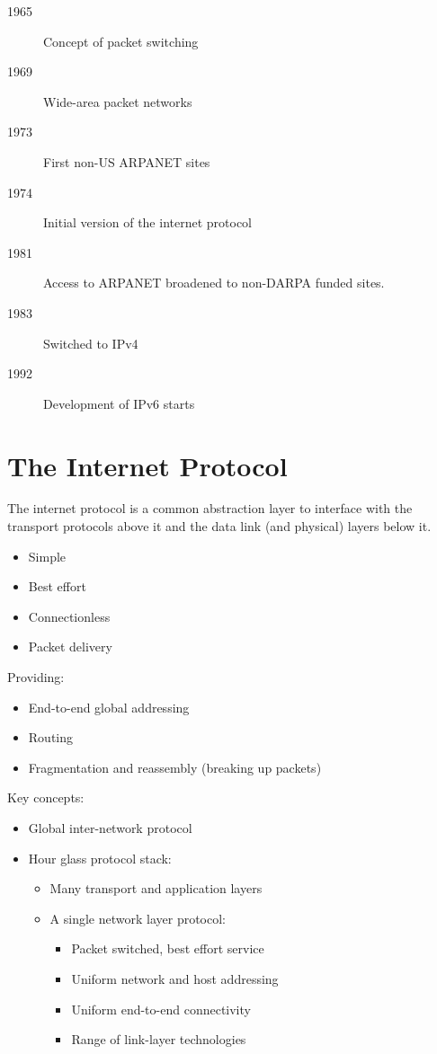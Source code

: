 \begin{description}
	\item[1965] Concept of packet switching
	\item[1969] Wide-area packet networks
	\item[1973] First non-US ARPANET sites
	\item[1974] Initial version of the internet protocol
	\item[1981] Access to ARPANET broadened to non-DARPA funded sites.
	\item[1983] Switched to IPv4
	\item[1992] Development of IPv6 starts
\end{description}

\section{The Internet Protocol}\label{sec:the_internet_protocol}

The internet protocol is a common abstraction layer to interface with the transport protocols above it and the data link (and physical) layers below it.
\begin{itemize}
	\item Simple
	\item Best effort
	\item Connectionless
	\item Packet delivery
\end{itemize}
Providing:
\begin{itemize}
	\item End-to-end global addressing
	\item Routing
	\item Fragmentation and reassembly (breaking up packets)
\end{itemize}
Key concepts:
\begin{itemize}
	\item Global inter-network protocol
	\item Hour glass protocol stack:
	      \begin{itemize}
		      \item Many transport and application layers
		      \item A single network layer protocol:
		            \begin{itemize}
			            \item Packet switched, best effort service
			            \item Uniform network and host addressing
			            \item Uniform end-to-end connectivity
			            \item Range of link-layer technologies
		            \end{itemize}
	      \end{itemize}
\end{itemize}

